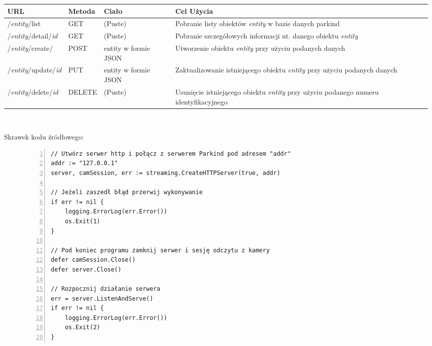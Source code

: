 \begin{table}[H]
	\centering

    \begin{center}
        \begin{tabular}{ | m{3.2cm} | m{1.75cm} | m{2cm} | m{5cm} | } \hline
            \textbf{URL} & \textbf{Metoda} & \textbf{Ciało} & \textbf{Cel Użycia} \\
            \hline
            \hline
            /\textit{entity}/list & GET & (Puste) & Pobranie listy obiektów \textit{entity} w bazie danych parkind \\
            \hline
            /\textit{entity}/detail/\textit{id} & GET & (Puste) & Pobranie szczegółowych informacji nt. danego obiektu \textit{entity} \\
            \hline
            /\textit{entity}/create/ & POST & entity w formie JSON & Utworzenie obiektu \textit{entity} przy użyciu podanych danych \\
            \hline
		/\textit{entity}/update/\textit{id} & PUT & entity w formie JSON & Zaktualizowanie istniejącego obiektu \textit{entity} przy użyciu podanych danych \\
            \hline
            /\textit{entity}/delete/\textit{id} & DELETE & (Puste) & Usunięcie istniejącego obiektu \textit{entity} przy użyciu podanego numeru identyfikacyjnego \\
            \hline
        \end{tabular} \\ 
    \end{center}

	\label{Tab:2tb1}
\end{table}

Skrawek kodu źródłowego:

\begin{figure}[H]
    \centering
    \begin{Verbatim}[numbers=left,xleftmargin=5mm]
// Utwórz serwer http i połącz z serwerem Parkind pod adresem "addr"
addr := "127.0.0.1"
server, camSession, err := streaming.CreateHTTPServer(true, addr)

// Jeżeli zaszedł błąd przerwij wykonywanie
if err != nil {
	logging.ErrorLog(err.Error())
	os.Exit(1)
}
    
// Pod koniec programu zamknij serwer i sesję odczytu z kamery
defer camSession.Close()
defer server.Close()

// Rozpocznij działanie serwera
err = server.ListenAndServe()
if err != nil {
	logging.ErrorLog(err.Error())
	os.Exit(2)
}
	\end{Verbatim}
    \label{code:2ch1}
\end{figure}





